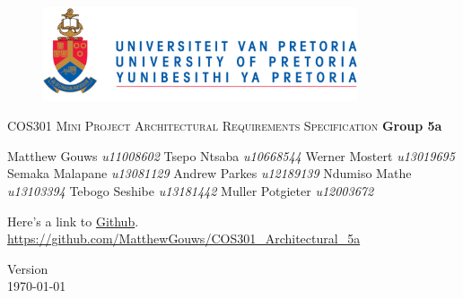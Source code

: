 \begin{titlepage}
\begin{center}
	\begin{figure}[t]
		\centering
		\includegraphics[width=350px]{UP_Logo.png}
	\end{figure}
	
\textsc{\LARGE COS301 Mini Project \newline\newline Architectural Requirements Specification}
		\textbf{\newline Group 5a} \\
		\begin{flushright} \large
			Matthew Gouws \emph{u11008602} \newline
			Tsepo Ntsaba \emph{u10668544} \newline
			Werner Mostert \emph{u13019695} \newline
			Semaka Malapane \emph{u13081129} \newline
			Andrew Parkes \emph{u12189139} \newline
			Ndumiso Mathe \emph{u13103394} \newline
			Tebogo Seshibe \emph{u13181442} \newline
			Muller Potgieter \emph{u12003672} \newline
		\end{flushright}
		
		\vfill
		
Here's a link to \href{https://github.com/MatthewGouws/COS301_Architectural_5a}{Github}.\\
	\url{https://github.com/MatthewGouws/COS301_Architectural_5a}		
		
		{\large Version }
		\\
		{\large \today}
		
\end{center}
\end{titlepage}
